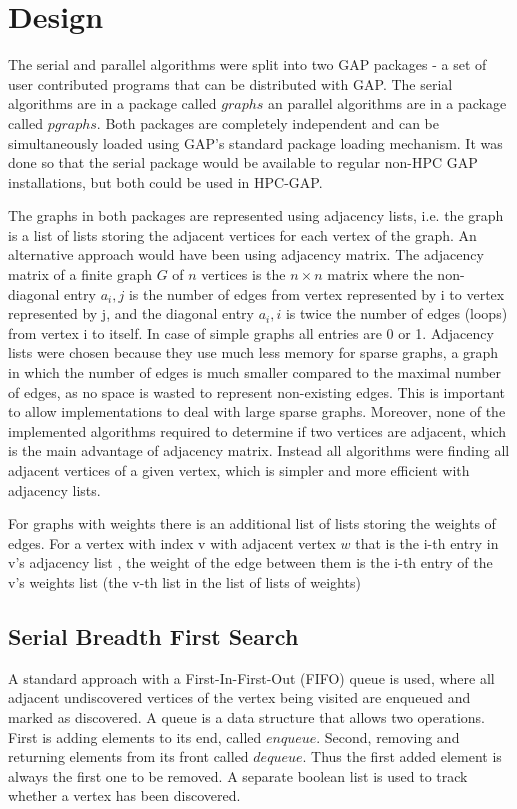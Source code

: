 \documentclass{report}
\theoremstyle{plain}
\theoremstyle{definition}
\theoremstyle{remark}
\begin{document}
\chapter{Design}

The serial and parallel algorithms were split into two GAP packages - a set of user contributed programs that can be distributed with GAP. The serial algorithms are in a package called $graphs$ an parallel algorithms are in a package called $pgraphs$. Both packages are completely independent and can be simultaneously loaded using GAP's standard package loading mechanism. It was done so that the serial package would be available to regular non-HPC GAP installations, but both could be used in HPC-GAP.

The graphs in both packages are represented using adjacency lists, i.e. the graph is a list of lists storing the adjacent vertices for each vertex of the graph. An alternative approach would have been using adjacency matrix. The adjacency matrix of a finite graph $G$ of $n$ vertices is the $n\times n$ matrix where the non-diagonal entry $a_i,j$ is the number of edges from vertex represented by i to vertex represented by j, and the diagonal entry $a_i,i$ is twice the number of edges (loops) from vertex i to itself. In case of simple graphs all entries are 0 or 1. Adjacency lists were chosen because they use much less memory for sparse graphs, a graph in which the number of edges is much smaller compared to the maximal number of edges, as no space is wasted to represent non-existing edges. This is important to allow implementations to deal with large sparse graphs. Moreover, none of the implemented algorithms required to determine if two vertices are adjacent, which is the main advantage of adjacency matrix. Instead all algorithms were finding all adjacent vertices of a given vertex, which is simpler and more efficient with adjacency lists.

For graphs with weights there is an additional list of lists storing the weights of edges. For a vertex with index v with adjacent vertex $w$ that is the i-th entry in v's adjacency list , the weight of the edge between them is the i-th entry of the v's weights list (the v-th list in the list of lists of weights) 

\section{Serial Breadth First Search}
 
A standard approach with a First-In-First-Out (FIFO) queue is used, where all adjacent undiscovered vertices of the vertex being visited are enqueued and marked as discovered. A queue is a data structure that allows two operations. First is adding elements to its end, called $enqueue$. Second, removing and returning elements from its front called $dequeue$. Thus the first added element is always the first one to be removed. A separate boolean list is used to track whether a vertex has been discovered.
\end{document}
